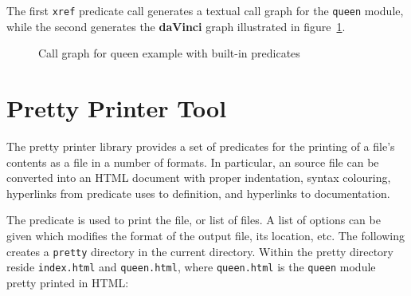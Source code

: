 The first {\tt xref} predicate call generates a textual call graph
for the {\tt queen} module, while the second generates the 
{\bf daVinci} graph illustrated in figure~\ref{xrefdavinci}.

\begin{figure}[hbt]
\begin{center}
\end{center}
\caption{Call graph for queen example with built-in predicates}
\label{xrefdavinci}
\end{figure}


\section{Pretty Printer Tool}

The pretty printer library provides a set of predicates for the printing
of a file's contents as a file in a number of formats.
In particular, an {\eclipse} source file can be converted into an
HTML document with proper indentation, syntax colouring, hyperlinks
from predicate uses to definition, and hyperlinks to documentation.

The  
predicate is used to print the file, or list of files.
A list of options can be given which modifies the format of the output
file, its location, etc.  The following creates a {\tt pretty}
directory in the current directory. Within the pretty directory reside
{\tt index.html} and {\tt queen.html}, where {\tt queen.html} is the 
{\tt queen} module pretty printed in HTML:


